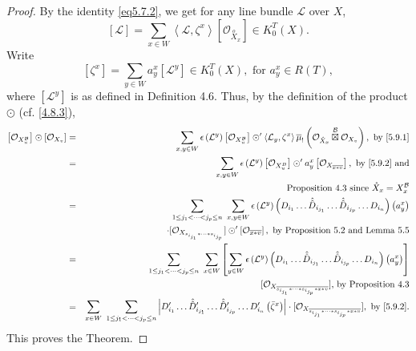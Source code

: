 \documentclass{article}
\def\L{\mathcal{L}}
\def\B{\mathcal{B}}
\def\ref#1{#1}
\begin{document}
\begin{proof}
By the identity \eqref{eq5.7.2}, we get for any line bundle $\L$ over $X$,
\begin{equation}\label{5.9.1}
\left[\L \right] =\sum_{x\in W} \left\langle \L,\zeta^x\right\rangle \left[ \mathcal{O}_{\overset{o}{X}_x}\right] \in K^T_0 \left(X\right).
\end{equation}
Write 
\begin{equation}\label{5.9.2}
\left[\zeta^x\right] =\sum_{y\in W}a^x_y\left[\L^y \right] \in K_0^T \left(X\right), \mbox{ for } a^x_y \in R(T),
\end{equation}
where $[\L^y]$ is as defined in Definition \ref{4.6}.
Thus, by the definition of the product $\odot$ (cf. \eqref{4.8.3}),
\begin{eqnarray*}
\left[ \mathcal{O}_{X_u^\B} \right] \odot \left[ \mathcal{O} _{X_v}\right] &=& \sum_{x,y\in W} \epsilon \left(\L^y\right) \left[\mathcal{O}_{X_u^\B}\right] \odot' \left\langle \L_y, \zeta^x\right\rangle \overline{\mu}_! \left( \mathcal{O}_{\mathring{X}_x} \overset{\B}{\boxtimes} \mathcal{O}_{X_v} \right), \mbox{ by } \eqref{5.9.1}\\
&=& \sum_{x,y\in W} \epsilon \left(\L^y\right) \left[\mathcal{O}_{X^B_u}\right] \odot' a_y^x \left[ \mathcal{O}_{X_{\overline{x*v}}}\right], \mbox{ by } \eqref{5.9.2} \mbox{ and}\\&&\mbox{ Proposition \ref{4.3}
 since }\mathring{X}_x =X^\B_x\\
&=& \sum_{1\leq j_1 < \cdots < j_p \leq n} \,\,\sum_{x,y\in W} \epsilon \left(\L^y\right) \left( D_{i_1} \ldots {\hat{\hat{D}}}_{i_{j_1}} \ldots {\hat{\hat{D}}}_{i_{j_p}} \ldots D_{i_n}\right) \left( a^x_y
\right)\\
&&\cdot [ \mathcal{O}_{X_{s_{i_{j_1}}*\cdots *s_{i_{j_p}}}}] \odot' \left[ \mathcal{O}_{\overline{x*v}}\right],  \mbox{ by Proposition \ref{5.2} and  Lemma \ref{5.5}}\\
&=& \sum_{1\leq j_1 < \cdots < j_p \leq n} \,\,\sum_{x\in W} \left[\sum_{y\in W} \epsilon \left(\L^y\right) \left( D_{i_1} \ldots \hat{\hat{D}}_{i_{j_1}} \ldots \hat{\hat{D}}_{i_{j_p}} \ldots D_{i_n}\right)
 \left( a^x_y\right)\right]\\
&&[ \mathcal{O}_{X_{\overline{s_{i_{j_1}}*\cdots *s_{i_{j_p}}*x*v}}}]\mbox{, by Proposition \ref{4.3}}\\
&=& \sum_{x\in W} \,\,\sum_{1\leq j_1 < \cdots < j_p \leq n}  \left\vert D_{i_1}' \ldots \hat{\hat{D}}'_{i_{j_1}} \ldots \hat{\hat{D}}'_{i_{j_p}} \ldots D_{i_n}' \left(\bar{\zeta}^x\right)\right\vert
\cdot [ \mathcal{O}_{X_{\overline{s_{i_{j_1}}*\cdots *s_{i_{j_p}}*x*v}}}], \mbox{ by \eqref{5.9.2}}.
\end{eqnarray*}
This proves the Theorem. 
\end{proof}
\end{document}
